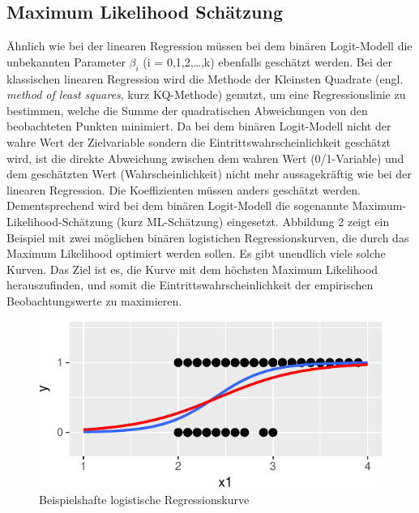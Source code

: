 \documentclass[12pt,]{article}
\begin{document}
\subsection{Maximum Likelihood
Schätzung}\label{maximum-likelihood-schatzung}

Ähnlich wie bei der linearen Regression müssen bei dem binären
Logit-Modell die unbekannten Parameter \(\beta_i\) (i =
0,1,2,\ldots{},k) ebenfalls geschätzt werden. Bei der klassischen
linearen Regression wird die Methode der Kleinsten Quadrate (engl.
\emph{method of least squares}, kurz KQ-Methode) genutzt, um eine
Regressionslinie zu bestimmen, welche die Summe der quadratischen
Abweichungen von den beobachteten Punkten minimiert. Da bei dem binären
Logit-Modell nicht der wahre Wert der Zielvariable sondern die
Eintrittswahrscheinlichkeit geschätzt wird, ist die direkte Abweichung
zwischen dem wahren Wert (0/1-Variable) und dem geschätzten Wert
(Wahrscheinlichkeit) nicht mehr aussagekräftig wie bei der linearen
Regression. Die Koeffizienten müssen anders geschätzt werden.
Dementsprechend wird bei dem binären Logit-Modell die sogenannte
Maximum-Likelihood-Schätzung (kurz ML-Schätzung) eingesetzt. Abbildung 2
zeigt ein Beispiel mit zwei möglichen binären logistichen
Regressionskurven, die durch das Maximum Likelihood optimiert werden
sollen. Es gibt unendlich viele solche Kurven. Das Ziel ist es, die
Kurve mit dem höchsten Maximum Likelihood herauszufinden, und somit die
Eintrittswahrscheinlichkeit der empirischen Beobachtungswerte zu
maximieren.

\begin{figure}[h]

{\centering \includegraphics{logisticRegression_files/figure-latex/unnamed-chunk-2-1} 

}

\caption{Beispielshafte logistische Regressionskurve}\label{fig:unnamed-chunk-2}
\end{figure}
\end{document}
